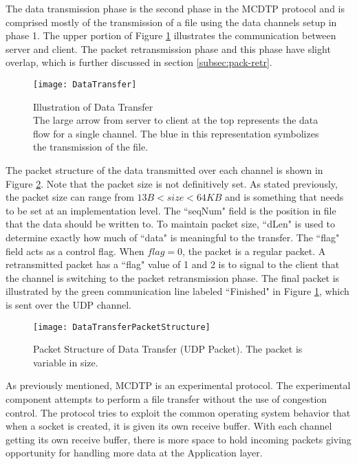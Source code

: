 The data transmission phase is the second phase in the MCDTP protocol and is comprised mostly of the transmission of a file using the data channels setup in phase 1. The upper portion of Figure \ref{fig:data-tr} illustrates the communication between server and client. The packet retransmission phase and this phase have slight overlap, which is further discussed in section \ref{subsec:pack-retr}.

\begin{figure}[ht]
\centering
\texttt{[image: DataTransfer]}
\caption{Illustration of Data Transfer\\
The large arrow from server to client at the top represents the data flow for a single channel. The blue in this representation symbolizes the transmission of the file.}
\label{fig:data-tr}
\end{figure}

The packet structure of the data transmitted over each channel is shown in Figure \ref{fig:data-tr-struct}. Note that the packet size is not definitively set. As stated previously, the packet size can range from $13B < size < 64KB$ and is something that needs to be set at an implementation level. The ``seqNum" field is the position in file that the data should be written to. To maintain packet size, ``dLen" is used to determine exactly how much of ``data" is meaningful to the transfer. The ``flag" field acts as a control flag. When $flag=0$, the packet is a regular packet. A retransmitted packet has a ``flag" value of 1 and 2 is to signal to the client that the channel is switching to the packet retransmission phase. The final packet is illustrated by the green communication line labeled ``Finished" in Figure \ref{fig:data-tr}, which is sent over the UDP channel.

\begin{figure}[ht]
\centering
\texttt{[image: DataTransferPacketStructure]}
\caption{Packet Structure of Data Transfer (UDP Packet). The packet is variable in size.}
\label{fig:data-tr-struct}
\end{figure}

As previously mentioned, MCDTP is an experimental protocol. The experimental component attempts to perform a file transfer without the use of congestion control. The protocol tries to exploit the common operating system behavior that when a socket is created, it is given its own receive buffer. With each channel getting its own receive buffer, there is more space to hold incoming packets giving opportunity for handling more data at the Application layer.

